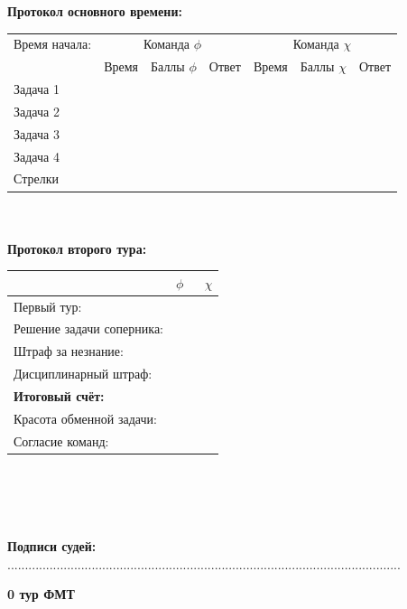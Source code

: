 \documentclass[12pt]{article}
\begin{document}
\begin{center}{\bf Протокол основного времени: } \\ 
\begin{tabular}{|p{3.3cm}|p{1.5cm}|p{2cm}|p{1.5cm}|p{1.5cm}|p{2cm}|p{1.5cm}|}
\hline Время начала: & \multicolumn{3}{c|}{Команда $\phi$} & \multicolumn{3}{c|}{Команда $\chi$ }\\\cline{2-7} {} & Время & Баллы $\phi$ & Ответ & Время & Баллы $\chi$ & Ответ \\\hline \hline \center Задача 1 &{}&{}&{}&{}&{}&{}\\[20mm]\hline \hline \center Задача 2 &{}&{}&{}&{}&{}&{}\\[20mm]\hline \hline \center Задача 3 &{}&{}&{}&{}&{}&{}\\[20mm]\hline \hline \center Задача 4 &{}&{}&{}&{}&{}&{}\\[20mm]\hline \hline \center Стрелки &{}&{}&{}&{}&{}&{}\\[20mm]\hline
\end{tabular}
$ $\\
$ $\\
{\bf Протокол второго тура: } \\ 
\begin{tabular}{ | p{7cm} | p{1cm} | p{1cm} |}
\hline
$ $ & \centering $\phi$ & $\;$ $\chi$ \\ \hline\raggedleft Первый тур: & & \\ \hline\raggedleft Решение задачи соперника: & & \\ \hline\raggedleft Штраф за незнание: & & \\ \hline\raggedleft Дисциплинарный штраф: & & \\ \hline\raggedleft \bf Итоговый счёт: & & \\ \hline \hline\raggedleft Красота обменной задачи: & & \\ \hline\raggedleft Согласие команд: & & \\ \hline\end{tabular}\end{center}
$ $\\
$ $\\
$ $\\
$ $\\
{\bf Подписи судей: }................................................................................................................\newpage
\begin{center}
{\Huge \bf 0 тур ФМТ}
\end{center}
\end{document}
